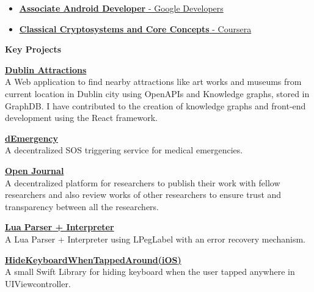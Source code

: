 \documentclass{article}
\begin{document}
\begin{itemize}[noitemsep,nolistsep,leftmargin=*]
    \item { \normalsize \href{https://www.credential.net/623b189c-719c-4845-b489-1b1618d4da79}{\textbf{Associate Android Developer} - Google Developers } }
    \item { \normalsize \href{https://www.coursera.org/account/accomplishments/certificate/X4CNCJXC335V}{\textbf{Classical Cryptosystems and Core Concepts} - Coursera} }
\end{itemize}
\vspace{5pt}
\noindent \large \textbf{\textcolor{NavyBlue}{Key Projects}} \vspace{5pt}

\noindent \normalsize \href{}{\textbf{Dublin Attractions}} \\
\noindent \normalsize A Web application to find nearby attractions like art works and museums from current location in Dublin city using OpenAPIs and Knowledge graphs, stored in GraphDB. I have contributed to the creation of knowledge graphs and front-end development using the React framework.
\vspace{5pt}

\noindent \normalsize \href{https://bit.ly/31wXfMr}{\textbf{dEmergency}} \\
\noindent \normalsize A decentralized SOS triggering service for medical emergencies.
\vspace{5pt}

\noindent \normalsize \href{https://github.com/kdpisda/scientific-journal-blockchain}{\textbf{Open Journal}} \\
\noindent \normalsize A decentralized platform for researchers to publish their work with fellow researchers and also review works of other researchers to ensure trust and transparency between all the researchers.
\vspace{5pt}

\noindent \normalsize \href{https://gist.github.com/0a9d7b1a040249d1b525ab94198a42ac}{\textbf{Lua Parser + Interpreter}} \\
\noindent \normalsize A Lua Parser + Interpreter using LPegLabel with an error recovery mechanism.
\vspace{5pt}

\noindent \normalsize \href{https://bit.ly/3a62RB4}{\textbf{HideKeyboardWhenTappedAround(iOS)}} \\
\noindent \normalsize A small Swift Library for hiding keyboard when the user tapped anywhere in UIViewcontroller.
\vspace{5pt}
\end{document}
